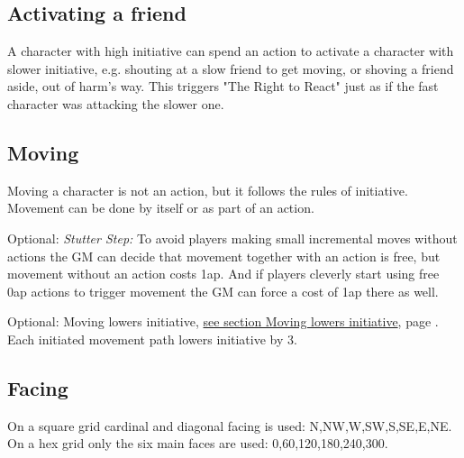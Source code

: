 \subsection*{Activating a friend}
A character with high initiative can spend an action to activate a character with slower initiative, e.g. shouting at a slow friend to get moving, or shoving a friend aside, out of harm's way. This triggers "The Right to React" just as if the fast character was attacking the slower one.






















\subsection*{Moving}
Moving a character is not an action, but it follows the rules of initiative. Movement can be done by itself or as part of an action.

Optional: \emph{Stutter Step:} To avoid players making small incremental moves without actions the GM can decide that movement together with an action is free, but movement without an action costs 1ap. And if players cleverly start using free 0ap actions to trigger movement the GM can force a cost of 1ap there as well.

Optional: Moving lowers initiative, \hyperref[sec:movinglowersinitiative]{see section Moving lowers initiative}, page \pageref{sec:movinglowersinitiative}. Each initiated movement path lowers initiative by 3.


\subsection*{Facing}
On a square grid cardinal and diagonal facing is used: N,NW,W,SW,S,SE,E,NE.
On a hex grid only the six main faces are used: 0,60,120,180,240,300\degree.

